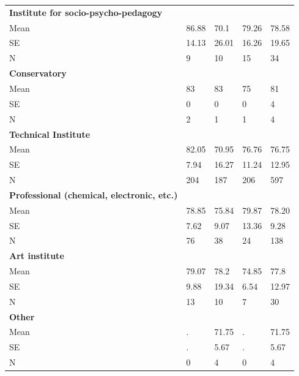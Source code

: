 \begin{table}[H]
\begin{center}
\begin{tabular}{lllll}
\textbf{Institute for socio-psycho-pedagogy}  \\ 
 \quad Mean & 86.88 &      70.1 & 79.26 & 78.58 \\
  \quad SE & 14.13 &   26.01  & 16.26 & 19.65 \\
  \quad N &    9  &       10   &      15 &        34 \\ 

\textbf{Conservatory}  \\ 
 \quad Mean &        83      &   83   &      75 &        81 \\
 \quad SE &         0       &   0    &      0 &         4 \\
 \quad N &         2        &  1     &     1 &         4 \\ 

\textbf{Technical Institute}  \\ 
 \quad Mean & 82.05 &  70.95 &  76.76 & 76.75 \\
 \quad SE & 7.94 & 16.27 &  11.24 &  12.95  \\
  \quad N &       204 &       187 &       206 &       597 \\ 

\textbf{Professional (chemical, electronic, etc.)}  \\ 
 \quad Mean & 78.85 & 75.84 &    79.87 & 78.20 \\
  \quad SE & 7.62 & 9.07 &  13.36 & 9.28 \\
  \quad N &        76 &        38 &        24 &       138 \\ 

\textbf{Art institute}  \\ 
 \quad Mean & 79.07 &      78.2 & 74.85 &      77.8 \\
 \quad SE & 9.88 & 19.34 & 6.54 &  12.97 \\
 \quad N &        13 &        10 &         7 &        30 \\ 

\textbf{Other}  \\ 
  \quad Mean &         . &     71.75 &         . &     71.75 \\
  \quad SE &         . & 5.67 &         . & 5.67 \\
  \quad N &         0 &         4 &         0 &         4 \\ \bottomrule

\end{tabular}
\end{center}
\end{table}
\normalsize

